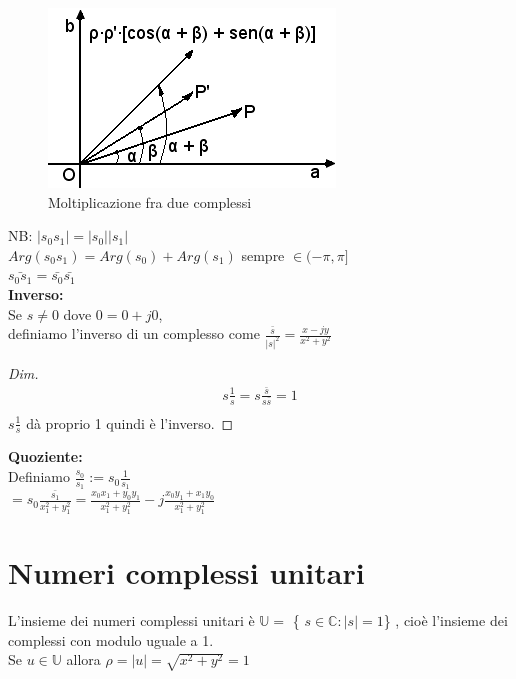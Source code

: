 \begin{figure}[h]
	\centering
	\includegraphics[scale=0.5]{immagini/moltiplicazioneComplessi}
	\caption{ Moltiplicazione fra due complessi }
	\label{fig: Moltiplicazione fra due complessi}
\end{figure}

NB: $ |s_{0} s_{1}| = |s_{0}||s_{1}|$ \\
$ Arg( s_{0} s_{1} ) = Arg(s_{0} ) + Arg( s_{1} )$ sempre $ \in (-\pi , \pi]$\\
$ \bar{s_{0} s_{1}} = \bar{s_{0} } \bar{s_{1}}$ \\

\textbf{Inverso:} \\
Se $ s \neq 0 $ dove $ 0 = 0 + j0 $,\\
definiamo l'inverso di un complesso come $ \frac{ \bar{s} }{ |s|^{2}} = \frac{x-jy}{x^{2} + y^{2}} $ \\
\begin{proof}[Dim]
	\begin{equation*}
	\begin{split}
	s \frac{1}{s} = s \frac{ \bar{s} }{s \bar{s}} = 1 \\
	\end{split}
	\end{equation*}
	$s \frac{1}{s}$ dà proprio 1 quindi è l'inverso.
\end{proof}

\textbf{Quoziente:} \\
Definiamo $\frac{s_{0}}{s_{1}} := s_{0} \frac{ 1 }{ s_{1}} $ \\
$= s_{0} \frac{ \bar{s_{1} }}{x_{1}^{2} + y_{1}^{2}} = \frac{ x_{0} x_{1} + y_{0} y_{1} }{ x_{1}^{2} + y_{1}^{2} } - j \frac{ x_{0} y_{1} + x_{1} y_{0} }{ x_{1}^{2} + y_{1}^{2} } $\\

\section{Numeri complessi unitari}
L'insieme dei numeri complessi unitari è $\mathbb{U} =$ \{ $s \in \mathbb{C} : |s|=1 $\} , cioè l'insieme dei complessi con modulo uguale a 1.\\
Se $ u \in \mathbb{U} $
allora $ \rho = |u| = \sqrt{ x^{2} + y^{2}} = 1 $

